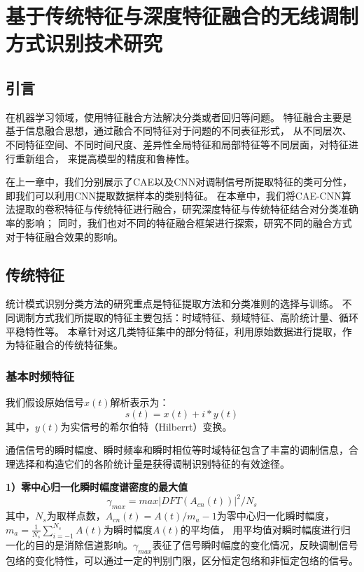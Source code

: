 \chapter{基于传统特征与深度特征融合的无线调制方式识别技术研究}
\section{引言}
在机器学习领域，使用特征融合方法解决分类或者回归等问题。
特征融合主要是基于信息融合思想，通过融合不同特征对于问题的不同表征形式，
从不同层次、不同特征空间、不同时间尺度、差异性全局特征和局部特征等不同层面，对特征进行重新组合，
来提高模型的精度和鲁棒性。\par

在上一章中，我们分别展示了CAE以及CNN对调制信号所提取特征的类可分性，即我们可以利用CNN提取数据样本的类别特征。
在本章中，我们将CAE-CNN算法提取的卷积特征与传统特征进行融合，研究深度特征与传统特征结合对分类准确率的影响；
同时，我们也对不同的特征融合框架进行探索，研究不同的融合方式对于特征融合效果的影响。\par

\section{传统特征}

统计模式识别分类方法的研究重点是特征提取方法和分类准则的选择与训练。
不同调制方式我们所提取的特征主要包括：时域特征、频域特征、高阶统计量、循环平稳特性等。
本章针对这几类特征集中的部分特征，利用原始数据进行提取，作为特征融合的传统特征集。\par

\subsection{基本时频特征}

我们假设原始信号$x(t)$解析表示为：
\begin{equation}
s(t)=x(t)+i*y(t)
\end{equation}
其中，$y(t)$为实信号的希尔伯特（Hilberrt）变换。\par

通信信号的瞬时幅度、瞬时频率和瞬时相位等时域特征包含了丰富的调制信息，合理选择和构造它们的各阶统计量是获得调制识别特征的有效途径。\par

\textbf{1）零中心归一化瞬时幅度谱密度的最大值}
\begin{equation}
\gamma_{max}=max|DFT(A_{cn}(t))|^{2}/N_s
\end{equation}
其中，$N_s$为取样点数，$A_{cn}(t)=A(t)/m_a-1$为零中心归一化瞬时幅度，
$m_a=\frac{1}{N_s}\sum_{i=-1}^{N_s}A(t)$为瞬时幅度$A(t)$的平均值，
用平均值对瞬时幅度进行归一化的目的是消除信道影响。$\gamma_{max}$表征了信号瞬时幅度的变化情况，反映调制信号包络的变化特性，可以通过一定的判别门限，区分恒定包络和非恒定包络的信号。


